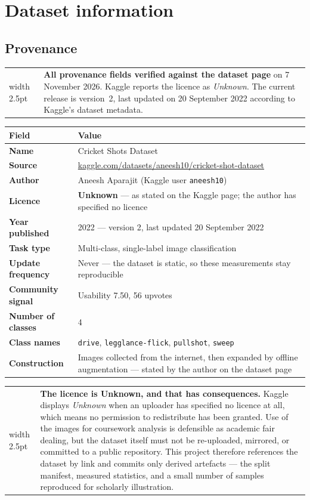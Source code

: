 \documentclass[11pt,a4paper]{article}
\makeatletter
\newenvironment{keybox}
  {\par\medskip\noindent\begin{tabular}{@{}p{0.3em}@{\hspace{0.8em}}p{\dimexpr\linewidth-2.2em}@{}}
   {\color{accent}\vrule width 2.5pt} &}
  {\end{tabular}\par\medskip}
\newenvironment{warnbox}
  {\par\medskip\noindent\begin{tabular}{@{}p{0.3em}@{\hspace{0.8em}}p{\dimexpr\linewidth-2.2em}@{}}
   {\color{warn}\vrule width 2.5pt} &}
  {\end{tabular}\par\medskip}
\makeatother
\begin{document}
\section{Dataset information}

\subsection{Provenance}
\label{sec:prov}

\begin{keybox}
\textbf{All provenance fields verified against the dataset page} on 7 November 2026.
Kaggle reports the licence as \emph{Unknown}. The current release is version~2, last
updated on 20 September 2022 according to Kaggle's dataset metadata.
\end{keybox}

\begin{tabularx}{\linewidth}{@{}>{\bfseries}p{4.2cm}X@{}}
\toprule
Field & Value \\
\midrule
Name & Cricket Shots Dataset \\
Source & \href{https://www.kaggle.com/datasets/aneesh10/cricket-shot-dataset}{kaggle.com/datasets/aneesh10/cricket-shot-dataset} \\
Author & Aneesh Aparajit (Kaggle user \texttt{aneesh10}) \\
Licence & \textbf{Unknown} --- as stated on the Kaggle page; the author has specified no licence \\
Year published & 2022 --- version 2, last updated 20 September 2022 \\
Task type & Multi-class, single-label image classification \\
Update frequency & Never --- the dataset is static, so these measurements stay reproducible \\
Community signal & Usability 7.50, 56 upvotes \\
Number of classes & 4 \\
Class names & \texttt{drive}, \texttt{legglance-flick}, \texttt{pullshot}, \texttt{sweep} \\
Construction & Images collected from the internet, then expanded by offline augmentation --- stated by the author on the dataset page \\
\bottomrule
\end{tabularx}

\begin{warnbox}
\textbf{The licence is Unknown, and that has consequences.} Kaggle displays
\emph{Unknown} when an uploader has specified no licence at all, which means no
permission to redistribute has been granted. Use of the images for coursework analysis
is defensible as academic fair dealing, but the dataset itself must not be re-uploaded,
mirrored, or committed to a public repository. This project therefore references the
dataset by link and commits only derived artefacts --- the split manifest, measured
statistics, and a small number of samples reproduced for scholarly illustration.
\end{warnbox}
\end{document}
